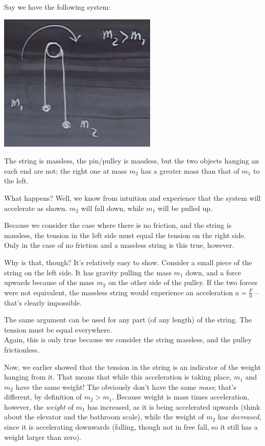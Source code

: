 \documentclass[8.01x]{subfiles}
\begin{document}
Say we have the following system:

\begin{center}
\includegraphics[scale=0.8]{Graphics/lec7_pulley}
\end{center}

The string is massless, the pin/pulley is massless, but the two objects hanging an each end are not; the right one at mass $m_2$ has a greater mass than that of $m_1$ to the left.

What happens? Well, we know from intuition and experience that the system will accelerate as shown. $m_2$ will fall down, while $m_1$ will be pulled up.

Because we consider the case where there is no friction, and the string is massless, the tension in the left side must equal the tension on the right side. Only in the case of no friction and a massless string is this true, however.

Why is that, though? It's relatively easy to show. Consider a small piece of the string on the left side. It has gravity pulling the mass $m_1$ down, and a force upwards because of the mass $m_2$ on the other side of the pulley. If the two forces were not equivalent, the massless string would experience an acceleration $a = \frac{F}{0}$ -- that's clearly impossible.	

The same argument can be used for any part (of any length) of the string. The tension must be equal everywhere.\\
Again, this is only true because we consider the string massless, and the pulley frictionless.

Now, we earlier showed that the tension in the string is an indicator of the weight hanging from it. That means that while this acceleration is taking place, $m_1$ and $m_2$ have the same weight! The obviously don't have the same \emph{mass}; that's different, by definition of $m_2 > m_1$. Because weight is mass times acceleration, however, the \emph{weight} of $m_1$ has increased, as it is being accelerated upwards (think about the elevator and the bathroom scale), while the weight of $m_2$ has \emph{decreased}, since it is accelerating downwards (falling, though not in free fall, so it still has a weight larger than zero).
\end{document}
